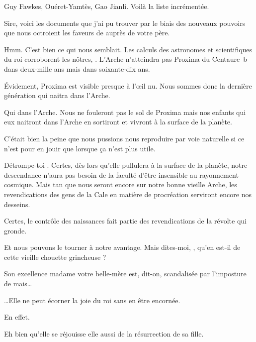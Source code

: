 \begin{drama}

  \elenaspeaks Guy Fawkes, Ouéret-Yamtès, Gao Jianli. Voilà la liste incrémentée.

  \intrat{\alexas}

  \alexasspeaks Sire, voici les documents que j’ai pu trouver par le biais des nouveaux pouvoirs que nous octroient les faveurs de \ela auprès de votre père.

  \elenaspeaks {} Hmm.  C’est bien ce qui nous semblait. Les calculs des astronomes et scientifiques du roi corroborent les nôtres, \alexas{}. L’Arche n’atteindra pas Proxima du Centaure~b dans deux-mille ans mais dans soixante-dix ans.

  \alexasspeaks Évidement, Proxima est visible presque à l’œil nu. Nous sommes donc la dernière génération qui naitra dans l’Arche.

  \elenaspeaks Qui  dans l’Arche. Nous ne fouleront pas le sol de Proxima mais nos enfants qui eux naitront dans l’Arche en sortiront et vivront à la surface de la planète.

  \alexasspeaks C’était bien la peine que nous pussions nous reproduire par voie naturelle si ce n’est pour en jouir que lorsque ça n’est plus utile.

  \elenaspeaks Détrompe-toi \alexas. Certes, dès lors qu’elle pullulera à la surface de la planète, notre descendance n’aura pas besoin de la faculté d’être insensible au rayonnement cosmique. Mais tan que nous seront encore sur notre bonne vieille Arche, les revendications des gens de la Cale en matière de procréation serviront encore nos desseins.

  \alexasspeaks Certes, le contrôle des naissances fait partie des revendications de la révolte qui gronde.

  \elenaspeaks Et nous pouvons le tourner à notre avantage. Mais dites-moi, \alexas{}, qu’en est-il de cette vieille chouette grincheuse ?

  \alexasspeaks Son excellence madame votre belle-mère est, dit-on, scandalisée par l’imposture de \ela mais…

  \elenaspeaks …Elle ne peut écorner la joie du roi sans en être encornée.

  \alexasspeaks {} En effet.

  \elenaspeaks Eh bien qu’elle se réjouisse elle aussi de la résurrection de sa fille.


\end{drama}
